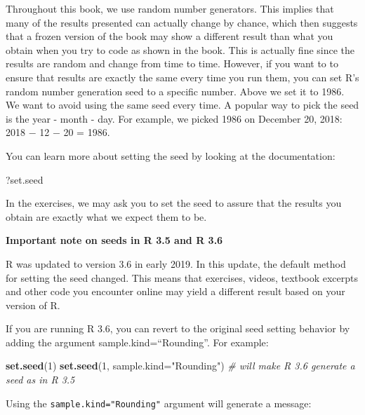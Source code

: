 \documentclass[
]{article}
\newenvironment{Shaded}{\begin{snugshade}}{\end{snugshade}}
\newcommand{\CommentTok}[1]{\textcolor[rgb]{0.56,0.35,0.01}{\textit{#1}}}
\newcommand{\DataTypeTok}[1]{\textcolor[rgb]{0.13,0.29,0.53}{#1}}
\newcommand{\DecValTok}[1]{\textcolor[rgb]{0.00,0.00,0.81}{#1}}
\newcommand{\KeywordTok}[1]{\textcolor[rgb]{0.13,0.29,0.53}{\textbf{#1}}}
\newcommand{\NormalTok}[1]{#1}
\newcommand{\StringTok}[1]{\textcolor[rgb]{0.31,0.60,0.02}{#1}}
\begin{document}
Throughout this book, we use random number generators. This implies that
many of the results presented can actually change by chance, which then
suggests that a frozen version of the book may show a different result
than what you obtain when you try to code as shown in the book. This is
actually fine since the results are random and change from time to time.
However, if you want to to ensure that results are exactly the same
every time you run them, you can set R's random number generation seed
to a specific number. Above we set it to 1986. We want to avoid using
the same seed every time. A popular way to pick the seed is the year -
month - day. For example, we picked 1986 on December 20, 2018: 2018 − 12
− 20 = 1986.

You can learn more about setting the seed by looking at the
documentation:

\begin{Shaded}
\begin{Highlighting}[]
\StringTok{\textasciigrave{}\textasciigrave{}\textasciigrave{}}\DataTypeTok{?set.seed}
\end{Highlighting}
\end{Shaded}

In the exercises, we may ask you to set the seed to assure that the
results you obtain are exactly what we expect them to be.

\textbf{Important note on seeds in R 3.5 and R 3.6}

R was updated to version 3.6 in early 2019. In this update, the default
method for setting the seed changed. This means that exercises, videos,
textbook excerpts and other code you encounter online may yield a
different result based on your version of R.

If you are running R 3.6, you can revert to the original seed setting
behavior by adding the argument sample.kind=``Rounding''. For example:

\begin{Shaded}
\begin{Highlighting}[]
\KeywordTok{set.seed}\NormalTok{(}\DecValTok{1}\NormalTok{)}
\KeywordTok{set.seed}\NormalTok{(}\DecValTok{1}\NormalTok{, }\DataTypeTok{sample.kind=}\StringTok{"Rounding"}\NormalTok{)    }\CommentTok{\# will make R 3.6 generate a seed as in R 3.5}
\end{Highlighting}
\end{Shaded}

Using the \texttt{sample.kind="Rounding"} argument will generate a
message:
\end{document}
